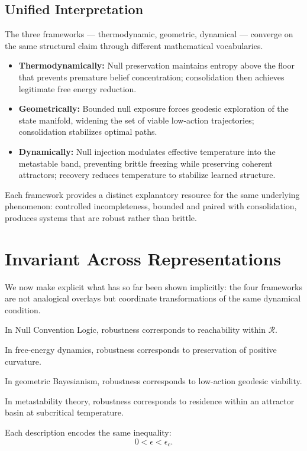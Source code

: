 \documentclass[11pt]{article}
\theoremstyle{remark}
\begin{document}
\subsection{Unified Interpretation}

The three frameworks --- thermodynamic, geometric, dynamical --- converge on the same structural claim through different mathematical vocabularies.

\begin{itemize}
  \item \textbf{Thermodynamically:} Null preservation maintains entropy above the floor that prevents premature belief concentration; consolidation then achieves legitimate free energy reduction.
  \item \textbf{Geometrically:} Bounded null exposure forces geodesic exploration of the state manifold, widening the set of viable low-action trajectories; consolidation stabilizes optimal paths.
  \item \textbf{Dynamically:} Null injection modulates effective temperature into the metastable band, preventing brittle freezing while preserving coherent attractors; recovery reduces temperature to stabilize learned structure.
\end{itemize}

Each framework provides a distinct explanatory resource for the same underlying phenomenon: controlled incompleteness, bounded and paired with consolidation, produces systems that are robust rather than brittle.

\section{Invariant Across Representations}
\label{sec:invariant}

We now make explicit what has so far been shown implicitly: the four frameworks are not analogical overlays but coordinate transformations of the same dynamical condition.

In Null Convention Logic, robustness corresponds to reachability within $\mathcal{R}$.

In free-energy dynamics, robustness corresponds to preservation of positive curvature.

In geometric Bayesianism, robustness corresponds to low-action geodesic viability.

In metastability theory, robustness corresponds to residence within an attractor basin at subcritical temperature.

Each description encodes the same inequality:
\[
0 < \epsilon < \epsilon_c.
\]
\end{document}
